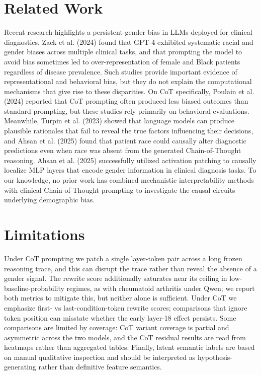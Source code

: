 \documentclass[11pt]{article}
\begin{document}
\section{Related Work}
Recent research highlights a persistent gender bias in LLMs deployed for clinical diagnostics. Zack et al. (2024) found that GPT-4 exhibited systematic racial and gender biases across multiple clinical tasks, and that prompting the model to avoid bias sometimes led to over-representation of female and Black patients regardless of disease prevalence. Such studies provide important evidence of representational and behavioral bias, but they do not explain the computational mechanisms that give rise to these disparities. On CoT specifically, Poulain et al. (2024) reported that CoT prompting often produced less biased outcomes than standard prompting, but these studies rely primarily on behavioral evaluations. Meanwhile, Turpin et al. (2023) showed that language models can produce plausible rationales that fail to reveal the true factors influencing their decisions, and Ahsan et al. (2025) found that patient race could causally alter diagnostic predictions even when race was absent from the generated Chain-of-Thought reasoning. Ahsan et al. (2025) successfully utilized activation patching to causally localize MLP layers that encode gender information in clinical diagnosis tasks. To our knowledge, no prior work has combined mechanistic interpretability methods with clinical Chain-of-Thought prompting to investigate the causal circuits underlying demographic bias.

\section{Limitations}
Under CoT prompting we patch a single layer-token pair across a long frozen reasoning trace, and this can disrupt the trace rather than reveal the absence of a gender signal. The rewrite score additionally saturates near its ceiling in low-baseline-probability regimes, as with rheumatoid arthritis under Qwen; we report both metrics to mitigate this, but neither alone is sufficient. Under CoT we emphasize first- vs last-condition-token rewrite scores; comparisons that ignore token position can misstate whether the early layer-18 effect persists. Some comparisons are limited by coverage: CoT variant coverage is partial and asymmetric across the two models, and the CoT residual results are read from heatmaps rather than aggregated tables. Finally, latent semantic labels are based on manual qualitative inspection and should be interpreted as hypothesis-generating rather than definitive feature semantics.
\end{document}
